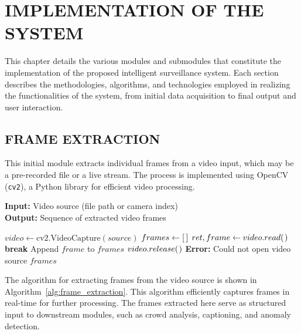 \chapter{\MakeUppercase{Implementation of the System}}

This chapter details the various modules and submodules that constitute the implementation of the proposed intelligent surveillance system. Each section describes the methodologies, algorithms, and technologies employed in realizing the functionalities of the system, from initial data acquisition to final output and user interaction.

\section{\MakeUppercase{Frame Extraction}}
This initial module extracts individual frames from a video input, which may be a pre-recorded file or a live stream. The process is implemented using OpenCV (\texttt{cv2}), a Python library for efficient video processing.

\begin{algorithm}[H]
\caption{Frame Extraction from Video Source}
\label{alg:frame_extraction}
\textbf{Input:} Video source (file path or camera index)\\
\textbf{Output:} Sequence of extracted video frames
\begin{algorithmic}[1]
    \State $video \gets \text{cv2.VideoCapture}(source)$
    \State $frames \gets [\hspace{0.2em}]$
            \State $ret, frame \gets video.read(\hspace{0.1em})$
                \State \textbf{break}
            \EndIf
            \State Append $frame$ to $frames$
        \EndWhile
        \State $video.release(\hspace{0.1em})$
    \Else
        \State \textbf{Error:} Could not open video source
    \EndIf
    \State \Return $frames$
\EndFunction
\end{algorithmic}
\end{algorithm}




The algorithm for extracting frames from the video source is shown in Algorithm~\ref{alg:frame_extraction}. This algorithm efficiently captures frames in real-time for further processing. The frames extracted here serve as structured input to downstream modules, such as crowd analysis, captioning, and anomaly detection.

